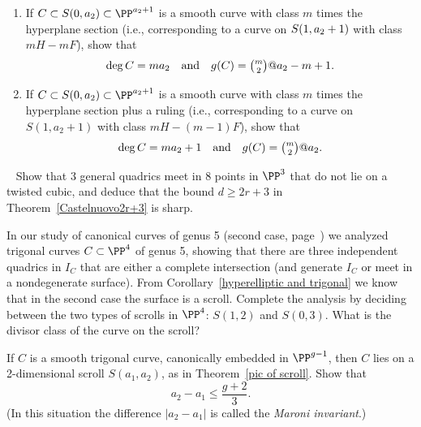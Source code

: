 \begin{exercise}\label{curves on cones}
\begin{enumerate}
\item If $C \subset S(0, a_2) \subset \PP^{a_2+1}$ is a smooth curve
with class $m$ times the hyperplane section (i.e., corresponding to
a curve on $S(1,a_2+\nobreak 1)$ with class $mH - mF$), show that
$$
\deg C = ma_2 \quad \text{and} \quad g(C) = \tbinom{m}{2}@a_2 - m + 1.
$$
\item If $C \subset S(0, a_2) \subset \PP^{a_2+1}$ is a smooth curve
with class $m$ times the hyperplane section plus a ruling (i.e.,
corresponding to a curve on $S(1,a_2+1)$ with class $mH - (m-1)F$),
show that
$$
\deg C = ma_2 + 1 \quad \text{and} \quad g(C) = \tbinom{m}{2}@a_2.
$$
\end{enumerate}
\end{exercise}

\begin{exercise}~\label{2r+3 is sharp}
Show that 3 general quadrics meet in 8 points in $\PP^3$ that do not
lie on a twisted cubic, and deduce that the bound $d \geq 2r+3$ in
Theorem~\ref{Castelnuovo2r+3}
is sharp.
\end{exercise}

\begin{exercise}
\label{extrigonal genus 5}
In
our study of canonical curves of genus 5 (second case,
page~\pageref{trigonal genus 5})
we analyzed 
trigonal curves $C\subset \PP^4$ of genus 5,
%
showing that
there are three independent quadrics in $I_C$ that are either a complete
intersection (and generate $I_C$ or
meet in a nondegenerate surface). From Corollary~\ref{hyperelliptic and
trigonal} we know that in the second case
the surface is a scroll. Complete the analysis by deciding between the
two types of scrolls in $\PP^4$: $S(1,2)$ and $S(0,3)$.
What is the divisor class of the curve on the scroll?
\end{exercise}

\begin{exercise}\label{Maroni Bound}
If $C$ is a smooth 
%
trigonal curve, 
canonically embedded in $\PP^{g-1}$,
then
$C$ lies on a 2-dimensional scroll $S(a_1, a_2)$, as in
Theorem~\ref{pic of scroll}. Show that
$$
a_2-a_1\leq \frac{g+2}{3}.
$$
(In this situation the difference $|a_2-a_1|$ is called the 
%
\emph{Maroni invariant}.)
%
\end{exercise}


